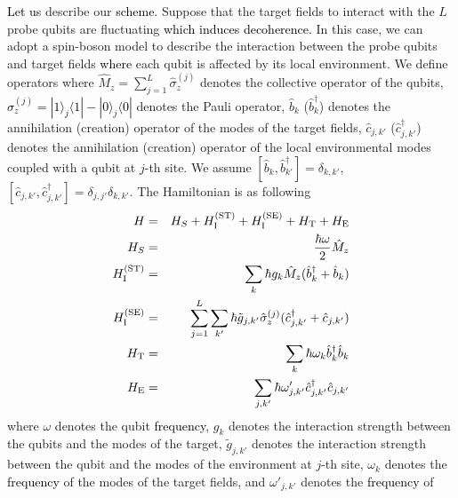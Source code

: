 \documentclass[prl,twocolumn,superscriptaddress]{revtex4}
\begin{document}
\textcolor{black}{Let us}
describe our \textcolor{black}{scheme.}
Suppose that the target fields to
interact with the $L$ probe qubits  are
fluctuating \textcolor{black}{which induces decoherence.}
In this case, we can adopt a spin-boson model to describe the
interaction between the probe qubits and target fields
\cite{palma1996quantum,breuer2002theory}
\textcolor{black}{where}
each qubit
is affected by its local environment.
We define operators where $\hat{M}_z=\sum_{j=1}^{L}\hat{\sigma }_z^{(j)}$ denotes the
collective operator of the qubits, \textcolor{black}{$\hat{\sigma }_z^{(j)} =|1\rangle_j
\langle 1|-|0\rangle _j\langle 0|$} denotes the Pauli operator,  $\hat{b}_{k}$
($\hat{b}_{k}^{\dagger }$) denotes the annihilation (creation) operator of
the modes of the target fields, $\hat{c}_{j,k'}$ ($\hat{c}^{\dagger }_{j,k'}$) denotes the annihilation (creation) operator of
the local environmental modes coupled with a qubit at $j$-th site. We assume $[\hat{b}_k,
\hat{b}^{\dagger }_{k'}]=\delta _{k,k'}$, $[\hat{c}_{j,k'},
\hat{c}^{\dagger }_{j,k'}]=\delta _{j,j'}\delta _{k,k'}$.
The Hamiltonian is as following 
 \begin{eqnarray}
  H&=&H_S+H^{(\rm{ST})}_{\rm{I}}+H^{(\rm{SE})}_{\rm{I}}+H_{\rm{T}}+H_{\rm{E}} \nonumber \\
  H_S&=&\frac{\hbar \omega }{2}\hat{M}_z\nonumber \\
  H^{(\rm{ST})}_{\rm{I}}&=&\sum_{k}\hbar g_k\hat{M}_z
   (\hat{b}^{\dagger }_k +\hat{b}_k)\nonumber \\
    H^{(\rm{SE})}_{\rm{I}}&=&\sum_{j=1}^{L}\sum_{k'}\hbar \tilde{g}_{j,k'}\hat{\sigma }_z^{(j)}
   (\hat{c}^{\dagger }_{j,k'} +\hat{c}_{j,k'})\nonumber \\
  H_{\rm{T}}&=&\sum_{k}\hbar \omega _k\hat{b}^{\dagger
   }_k\hat{b}_k\nonumber \\
  H_{\rm{E}}&=&\sum_{j,k'}\hbar \omega '_{j,k'}\hat{c}^{\dagger }_{j,k'}\hat{c}_{j,k'} \nonumber \\
 \end{eqnarray}
where $\omega $ denotes the qubit \textcolor{black}{frequency},
$g_k$ denotes the interaction strength between
the qubits and the modes of the target, $\tilde{g}_{j,k'}$ denotes the interaction strength between
the qubit and the modes of the environment at $j$-th site, $\omega _k$ denotes the \textcolor{black}{frequency} of
the modes of the target fields, and $\omega '_{j,k'}$ denotes the \textcolor{black}{frequency} of
\end{document}
